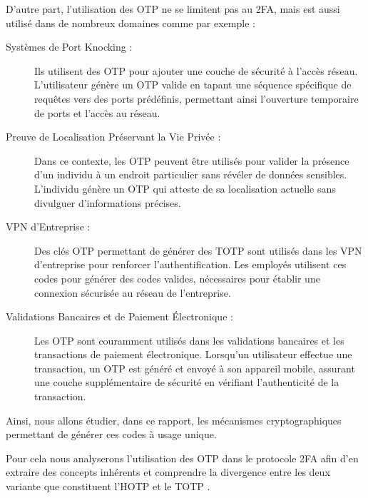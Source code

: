 \documentclass[a4paper, 10pt]{article}
\newcommand{\otp}{\textsc{OTP} }
\newcommand{\totp}{\textsc{TOTP} }
\newcommand{\hotp}{\textsc{HOTP} }
\begin{document}

    D'autre part, l'utilisation des \otp ne se limitent pas au \textsc{2FA}, mais est aussi \textcolor{myblue}{utilisé dans de nombreux domaines} comme par exemple :\\
\begin{description}
    \item[Systèmes de Port Knocking :] 
    Ils utilisent des \otp pour ajouter une couche de sécurité à l'accès réseau. L'utilisateur génère un \otp valide en tapant une séquence spécifique de requêtes vers des ports prédéfinis, permettant ainsi l'ouverture temporaire de ports et l'accès au réseau.\\

    \item[Preuve de Localisation Préservant la Vie Privée :]
    Dans ce contexte, les \otp peuvent être utilisés pour valider la présence d'un individu à un endroit particulier sans révéler de données sensibles. L'individu génère un \otp qui atteste de sa localisation actuelle sans divulguer d'informations précises.\\

    \item[VPN d’Entreprise :] 
Des clés \otp permettant de générer des \totp sont utilisés dans les VPN d'entreprise pour renforcer l'authentification. Les employés utilisent ces codes pour générer des codes valides, nécessaires pour établir une connexion sécurisée au réseau de l'entreprise.\\

    \item[Validations Bancaires et de Paiement Électronique :] 
Les \otp sont couramment utilisés dans les validations bancaires et les transactions de paiement électronique. Lorsqu'un utilisateur effectue une transaction, un \otp est généré et envoyé à son appareil mobile, assurant une couche supplémentaire de sécurité en vérifiant l'authenticité de la transaction.\\
\end{description}



    Ainsi, nous allons étudier, dans ce rapport, les \textcolor{myblue}{mécanismes cryptographiques} permettant de générer ces codes à usage unique.

    Pour cela nous analyserons l'\textcolor{myblue}{utilisation des \otp dans le protocole 2FA} afin d'en extraire des \textcolor{mygreen}{concepts }inhérents et comprendre la divergence entre les \textcolor{mygreen}{deux variante} que constituent l'\hotp et le \totp .
\end{document}
